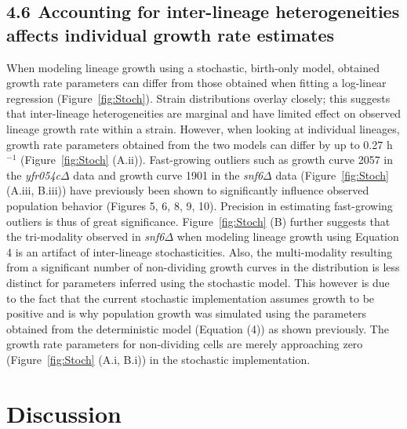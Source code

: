\documentclass{bioinfo}
\begin{document}
\vspace{-0.5em}
\subsection*{4.6$\>\>$Accounting for inter-lineage heterogeneities affects individual growth rate estimates}

When modeling lineage growth using a stochastic, birth-only model, obtained growth rate parameters can differ from those obtained when fitting a log-linear regression (Figure~\ref{fig:Stoch}). Strain distributions overlay closely; this suggests that inter-lineage heterogeneities are marginal and have limited effect on observed lineage growth rate within a strain. However, when looking at individual lineages, growth rate parameters obtained from the two models can differ by up to 0.27 h$^{-1}$ (Figure~\ref{fig:Stoch} (A.ii)). Fast-growing outliers such as growth curve 2057 in the \textit{yfr054c}$\Delta$ data and growth curve 1901 in the \textit{snf6}$\Delta$ data (Figure~\ref{fig:Stoch} (A.iii, B.iii)) have previously been shown to significantly influence observed population behavior (Figures 5, 6, 8, 9, 10). Precision in estimating fast-growing outliers is thus of great significance. Figure~\ref{fig:Stoch} (B) further suggests that the tri-modality observed in \textit{snf6}$\Delta$ when modeling lineage growth using Equation 4 is an artifact of inter-lineage stochasticities. Also, the multi-modality resulting from a significant number of non-dividing growth curves in the distribution is less distinct for parameters inferred using the stochastic model. This however is due to the fact that the current stochastic implementation assumes growth to be positive and is why population growth was simulated using the parameters obtained from the deterministic model (Equation (4)) as shown previously. The growth rate parameters for non-dividing cells are merely approaching zero (Figure~\ref{fig:Stoch} (A.i, B.i)) in the stochastic implementation.

\vspace{-2em}
\section{Discussion}
\end{document}

